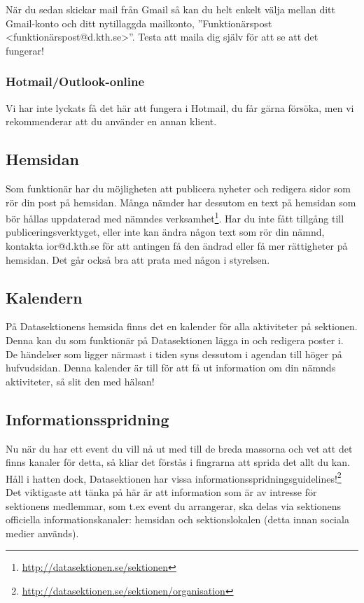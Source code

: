 \documentclass[a4paper,11pt]{article}
\begin{document}
\noindent När du sedan skickar mail från Gmail så kan du helt enkelt välja mellan ditt Gmail-konto och ditt nytillaggda mailkonto, ''Funktionärspost <funktionärspost@d.kth.se>''. Testa att maila dig själv för att se att det fungerar!

\subsubsection{Hotmail/Outlook-online}
Vi har inte lyckats få det här att fungera i Hotmail, du får gärna försöka, men vi rekommenderar att du använder en annan klient.

\subsection{Hemsidan}
Som funktionär har du möjligheten att publicera nyheter och redigera sidor som rör din post på hemsidan. Många nämder har dessutom en text på hemsidan som bör hållas uppdaterad med nämndes verksamhet\footnote{\url{http://datasektionen.se/sektionen}}. Har du inte fått tillgång till publiceringsverktyget, eller inte kan ändra någon text som rör din nämnd, kontakta ior@d.kth.se för att antingen få den ändrad eller få mer rättigheter på hemsidan. Det går också bra att prata med någon i styrelsen.

\subsection{Kalendern}
På Datasektionens hemsida finns det en kalender för alla aktiviteter på sektionen. Denna kan du som funktionär på Datasektionen lägga in och redigera poster i. De händelser som ligger närmast i tiden syns dessutom i agendan till höger på hufvudsidan. Denna kalender är till för att få ut information om din nämnds aktiviteter, så slit den med hälsan!


\subsection{Informationsspridning}
Nu när du har ett event du vill nå ut med till de breda massorna och vet att det finns kanaler för detta, så kliar det förstås i fingrarna att sprida det allt du kan. Håll i hatten dock, Datasektionen har vissa informationsspridningsguidelines!\footnote{\url{http://datasektionen.se/sektionen/organisation}} Det viktigaste att tänka på här är att information som är av intresse för sektionens medlemmar, som t.ex event du arrangerar, ska delas via sektionens officiella informationskanaler: hemsidan och sektionslokalen (detta innan sociala medier används).
\end{document}
